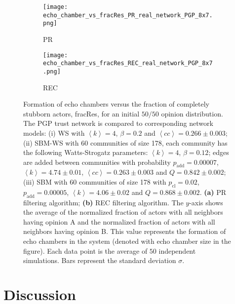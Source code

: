 \documentclass[11 pt , letterpaper , twoside , openright]{book}
\begin{document}
\begin{figure}[H]
  \begin{subfigure}[b]{0.49\textwidth}
    \caption{PR}
  	\texttt{[image: echo\_chamber\_vs\_fracRes\_PR\_real\_network\_PGP\_8x7.png]}
    \label{pr_real_PGP}
  \end{subfigure}
  \begin{subfigure}[b]{0.49\textwidth}
    \caption{REC}
  	\texttt{[image: echo\_chamber\_vs\_fracRes\_REC\_real\_network\_PGP\_8x7.png]}
    \label{rec_real_PGP}
  \end{subfigure}
  \captionsetup{format=plain}
  \caption[Formation of echo chambers versus fraction of completely stubborn actors for the PR and REC filtering algorithms and an initial $50/50$ opinion distribution. The PGP trust network is compared to corresponding network models.]{Formation of echo chambers versus the fraction of completely stubborn actors, fracRes, for an initial $50/50$ opinion distribution. The PGP trust network is compared to corresponding network models: (i) WS with $\left<k\right> = 4$, $\beta = 0.2$ and $\left<cc\right> = 0.266 \pm 0.003$; (ii) SBM-WS with 60 communities of size 178, each community has the following Watts-Strogatz parameters: $\left<k\right> = 4$, $\beta = 0.12$; edges are added between communities with probability $p_\text{add} = 0.00007$, $\left<k\right> = 4.74 \pm 0.01$, $\left<cc\right> = 0.263 \pm 0.003$ and $Q = 0.842 \pm 0.002$; (iii) SBM with 60 communities of size 178 with $p_\text{cl} = 0.02$, $p_\text{add} = 0.00005$, $\left<k\right> = 4.06 \pm 0.02$ and $Q = 0.868 \pm 0.002$. \textbf{(a)} PR filtering algorithm; \textbf{(b)} REC filtering algorithm. The $y$-axis shows the average of the normalized fraction of actors with all neighbors having opinion A and the normalized fraction of actors with all neighbors having opinion B. This value represents the formation of echo chambers in the system (denoted with echo chamber size in the figure). Each data point is the average of $50$ independent simulations. Bars represent the standard deviation $\sigma$.}
\label{echo_vs_fracRes_real_PGP}
\end{figure}

\chapter{Discussion}
\end{document}
